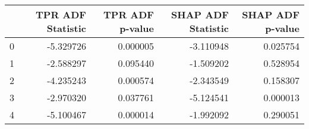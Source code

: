 \begin{tabular}{lrrrr}
\toprule
 & TPR ADF Statistic & TPR ADF p-value & SHAP ADF Statistic & SHAP ADF p-value \\
\midrule
0 & -5.329726 & 0.000005 & -3.110948 & 0.025754 \\
1 & -2.588297 & 0.095440 & -1.509202 & 0.528954 \\
2 & -4.235243 & 0.000574 & -2.343549 & 0.158307 \\
3 & -2.970320 & 0.037761 & -5.124541 & 0.000013 \\
4 & -5.100467 & 0.000014 & -1.992092 & 0.290051 \\
\bottomrule
\end{tabular}
